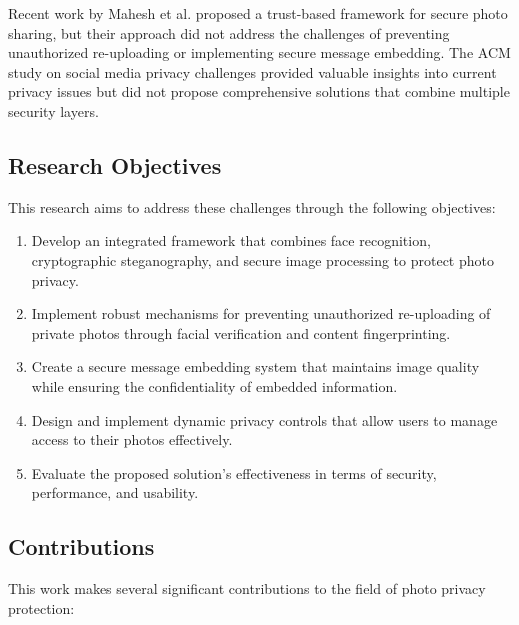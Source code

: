 \documentclass[pdflatex,sn-mathphys-num]{sn-jnl}%
\theoremstyle{thmstyleone}%
\theoremstyle{thmstyletwo}%
\theoremstyle{thmstylethree}%
\begin{document}
Recent work by Mahesh et al. \cite{mahesh2021trust} proposed a trust-based framework for secure photo sharing, but their approach did not address the challenges of preventing unauthorized re-uploading or implementing secure message embedding. The ACM study on social media privacy challenges \cite{acm2022} provided valuable insights into current privacy issues but did not propose comprehensive solutions that combine multiple security layers.

\subsection{Research Objectives}
This research aims to address these challenges through the following objectives:

\begin{enumerate}
    \item Develop an integrated framework that combines face recognition, cryptographic steganography, and secure image processing to protect photo privacy.
    
    \item Implement robust mechanisms for preventing unauthorized re-uploading of private photos through facial verification and content fingerprinting.
    
    \item Create a secure message embedding system that maintains image quality while ensuring the confidentiality of embedded information.
    
    \item Design and implement dynamic privacy controls that allow users to manage access to their photos effectively.
    
    \item Evaluate the proposed solution's effectiveness in terms of security, performance, and usability.
\end{enumerate}

\subsection{Contributions}
This work makes several significant contributions to the field of photo privacy protection:
\end{document}
